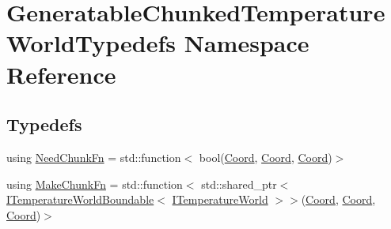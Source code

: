 \hypertarget{namespace_generatable_chunked_temperature_world_typedefs}{\section{Generatable\-Chunked\-Temperature\-World\-Typedefs Namespace Reference}
\label{namespace_generatable_chunked_temperature_world_typedefs}
}
\subsection*{Typedefs}
\begin{DoxyCompactItemize}
\item 
using \hyperlink{namespace_generatable_chunked_temperature_world_typedefs_a07d38658571f8f09839bc1bc8b105107}{Need\-Chunk\-Fn} = std\-::function$<$ bool(\hyperlink{struct_coord}{Coord}, \hyperlink{struct_coord}{Coord}, \hyperlink{struct_coord}{Coord})$>$
\item 
using \hyperlink{namespace_generatable_chunked_temperature_world_typedefs_a719e4469a105a21a76ed22274639c03a}{Make\-Chunk\-Fn} = std\-::function$<$ std\-::shared\-\_\-ptr$<$ \hyperlink{class_i_temperature_world_boundable}{I\-Temperature\-World\-Boundable}$<$ \hyperlink{class_i_temperature_world}{I\-Temperature\-World} $>$$>$(\hyperlink{struct_coord}{Coord}, \hyperlink{struct_coord}{Coord}, \hyperlink{struct_coord}{Coord})$>$
\end{DoxyCompactItemize}


